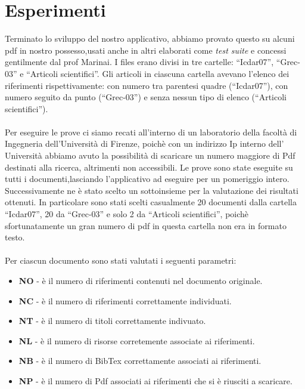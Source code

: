 \section{Esperimenti} \label{esperimenti}
Terminato lo sviluppo del nostro applicativo, abbiamo provato questo su alcuni pdf in nostro possesso,usati anche in altri elaborati come \textit{test suite} e concessi gentilmente dal prof Marinai.  I files erano divisi in tre cartelle: ``Icdar07'', ``Grec-03'' e ``Articoli scientifici''. Gli articoli in ciascuna cartella avevano l'elenco dei riferimenti rispettivamente: con numero tra parentesi quadre (``Icdar07''), con numero seguito da punto (``Grec-03'') e senza nessun tipo di elenco (``Articoli scientifici''). 
\\~\\
Per eseguire le prove ci siamo recati all'interno di un laboratorio della facoltà di Ingegneria dell'Università di Firenze, poichè con un indirizzo Ip interno dell' Università abbiamo avuto la possibilità di scaricare un numero maggiore di Pdf destinati alla ricerca, altrimenti non accessibili.
Le prove sono state eseguite su tutti i documenti,lasciando l'applicativo ad eseguire per un pomeriggio intero. Successivamente ne è stato scelto un sottoinsieme per la valutazione dei risultati ottenuti. In particolare sono stati scelti casualmente 20 documenti dalla cartella ``Icdar07'', 20 da ``Grec-03'' e solo 2 da ``Articoli scientifici'', poichè sfortunatamente un gran numero di pdf in questa cartella non era in formato testo.
\\~\\
Per ciascun documento sono stati valutati i seguenti parametri:
\begin{itemize}
 \item \textbf{NO} - è il numero di riferimenti contenuti nel documento originale.
 \item \textbf{NC} - è il numero di riferimenti correttamente individuati. 
 \item \textbf{NT} - è il numero di titoli correttamente indivuato.
 \item \textbf{NL} - è il numero di risorse corretemente associate ai riferimenti.
 \item \textbf{NB} - è il numero di BibTex correttamente associati ai riferimenti.
 \item \textbf{NP} - è il numero di Pdf associati ai riferimenti che si è riusciti a scaricare. 
\end{itemize}

